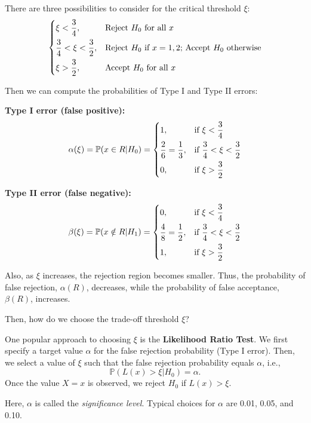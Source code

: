 There are three possibilities to consider for the critical threshold \(\xi\):
\[
  \begin{dcases}
    \xi < \frac{3}{4}, &\text{Reject \(H_0\) for all \(x\)} \\
    \frac{3}{4} < \xi < \frac{3}{2}, &\text{Reject \(H_0\) if \(x = 1, 2\); Accept \(H_0\) otherwise} \\
    \xi > \frac{3}{2}, &\text{Accept \(H_0\) for all \(x\)}
  \end{dcases}
\]

Then we can compute the probabilities of Type I and Type II errors:

\textbf{Type I error (false positive):}
\[
  \alpha(\xi) = \mathbb{P}(x \in R \vert H_0) = 
  \begin{dcases}
    1, &\text{if } \xi < \frac{3}{4} \\
    \frac{2}{6} = \frac{1}{3}, &\text{if } \frac{3}{4} < \xi < \frac{3}{2} \\
    0, &\text{if } \xi > \frac{3}{2}
  \end{dcases}
\]

\textbf{Type II error (false negative):}
\[
  \beta(\xi) = \mathbb{P}(x \notin R \vert H_1) = 
  \begin{dcases}
    0, &\text{if } \xi < \frac{3}{4} \\
    \frac{4}{8} = \frac{1}{2}, &\text{if } \frac{3}{4} < \xi < \frac{3}{2} \\
    1, &\text{if } \xi > \frac{3}{2}
  \end{dcases}
\]

Also, as \(\xi\) increases, the rejection region becomes smaller. Thus, the probability of false rejection, \(\alpha(R)\), decreases, while the probability of false acceptance, \(\beta(R)\), increases.

Then, how do we choose the trade-off threshold \(\xi\)? 

One popular approach to choosing \(\xi\) is the \textbf{Likelihood Ratio Test}. We first specify a target value \(\alpha\) for the false rejection probability (Type I error). Then, we select a value of \(\xi\) such that the false rejection probability equals \(\alpha\), i.e.,
\[
  \mathbb{P}(L(x) > \xi \vert H_0) = \alpha.
\]
Once the value \(X = x\) is observed, we reject \(H_0\) if \(L(x) > \xi\).

Here, \(\alpha\) is called the \emph{significance level}. Typical choices for \(\alpha\) are 0.01, 0.05, and 0.10.

